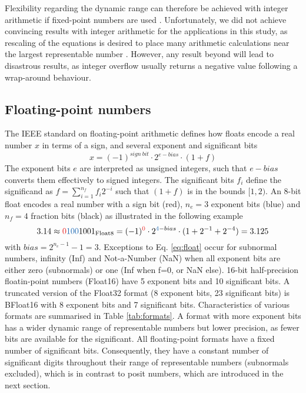 Flexibility regarding the dynamic range can therefore be achieved with integer arithmetic if fixed-point numbers are used
\citep{Russell2017}. Unfortunately, we did not achieve convincing results with integer arithmetic for the applications in this
study, as rescaling of the equations is desired to place many arithmetic calculations near the largest representable number
\citep{Klower2019}. However, any result beyond will lead to disastrous results, as integer overflow usually returns a negative
value following a wrap-around behaviour.

	\subsection{Floating-point numbers}
	\label{sec:floats}

The IEEE standard on floating-point arithmetic defines how floats encode a real number $x$ in terms of a sign, and several
exponent and significant bits
\begin{equation}
x = (-1)^{sign~bit} \cdot 2^{e-bias} \cdot (1+f)
\label{eq:float}
\end{equation}
The exponent bits $e$ are interpreted as unsigned integers, such that $e-bias$ converts them effectively to signed integers.
The significant bits $f_i$ define the significand as $f = \sum_{i=1}^{n_f} f_i 2^{-i}$ such that $(1+f)$ is in the bounds $[1,2)$.
An 8-bit float encodes a real number with a sign bit (red), $n_e = 3$ exponent bits (blue) and $n_f=4$ fraction bits (black) as
illustrated in the following example
\begin{equation}
3.14 \approx {\color{psign}0}{\color{pexpo}100}1001_{\op{Float8}} = (-1)^{\color{psign}0} \cdot 2^{{\color{pexpo}4}-bias}
\cdot (1+2^{-1}+2^{-4}) = 3.125
\label{eq:float_pos}
\end{equation}
with $bias=2^{n_e-1} - 1 = 3$. Exceptions to Eq. \ref{eq:float} occur for subnormal numbers, infinity (Inf) and Not-a-Number
(NaN) when all exponent bits are either zero (subnormals) or one (Inf when f=0, or NaN else). 16-bit half-precision floatin-point 
numbers (Float16) have 5 exponent bits and 10 significant bits. A truncated version of the Float32 format (8 exponent bits, 23 significant bits)
is BFloat16 with 8 exponent bits and 7 significant bits. Characteristics of various formats are summarised in Table \ref{tab:formats}.
A format with more exponent bits has a wider dynamic range of representable numbers but lower precision, as fewer bits are available
for the significant. All floating-point formats have a fixed number of significant bits. Consequently, they have a constant number of
significant digits throughout their range of representable numbers (subnormals excluded), which is in contrast to posit numbers,
which are introduced in the next section.

